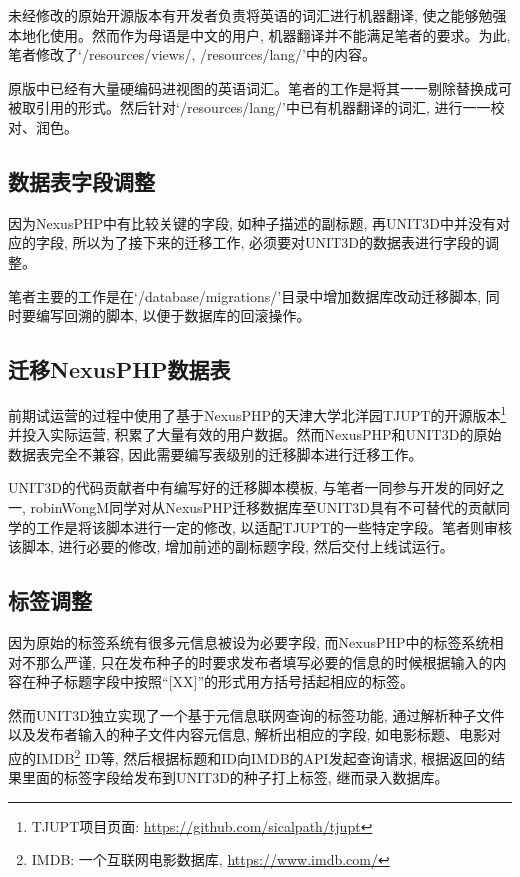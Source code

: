 未经修改的原始开源版本有开发者负责将英语的词汇进行机器翻译, 使之能够勉强本地化使用。然而作为母语是中文的用户, 机器翻译并不能满足笔者的要求。为此, 笔者修改了`/resources/views/, /resources/lang/'中的内容。

原版中已经有大量硬编码进视图的英语词汇。笔者的工作是将其一一剔除替换成可被取引用的形式。然后针对`/resources/lang/'中已有机器翻译的词汇, 进行一一校对、润色。


\subsection{数据表字段调整}

因为NexusPHP中有比较关键的字段, 如种子描述的副标题, 再UNIT3D中并没有对应的字段, 所以为了接下来的迁移工作, 必须要对UNIT3D的数据表进行字段的调整。

笔者主要的工作是在`/database/migrations/'目录中增加数据库改动迁移脚本, 同时要编写回溯的脚本, 以便于数据库的回滚操作。

\subsection{迁移NexusPHP数据表}

前期试运营的过程中使用了基于NexusPHP的天津大学北洋园TJUPT的开源版本\footnote{TJUPT项目页面: \url{https://github.com/sicalpath/tjupt}}并投入实际运营, 积累了大量有效的用户数据。然而NexusPHP和UNIT3D的原始数据表完全不兼容, 因此需要编写表级别的迁移脚本进行迁移工作。

UNIT3D的代码贡献者中有编写好的迁移脚本模板, 与笔者一同参与开发的同好之一, robinWongM同学对从NexusPHP迁移数据库至UNIT3D具有不可替代的贡献同学的工作是将该脚本进行一定的修改, 以适配TJUPT的一些特定字段。笔者则审核该脚本, 进行必要的修改, 增加前述的副标题字段, 然后交付上线试运行。

\subsection{标签调整}
\label{subsec:tagadjust}

因为原始的标签系统有很多元信息被设为必要字段, 而NexusPHP中的标签系统相对不那么严谨, 只在发布种子的时要求发布者填写必要的信息的时候根据输入的内容在种子标题字段中按照``[XX]''的形式用方括号括起相应的标签。 

然而UNIT3D独立实现了一个基于元信息联网查询的标签功能, 通过解析种子文件以及发布者输入的种子文件内容元信息, 解析出相应的字段, 如电影标题、电影对应的IMDB\footnote{IMDB: 一个互联网电影数据库, \url{https://www.imdb.com/}} ID等, 然后根据标题和ID向IMDB的API发起查询请求, 根据返回的结果里面的标签字段给发布到UNIT3D的种子打上标签, 继而录入数据库。

